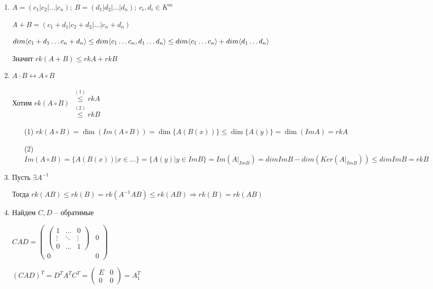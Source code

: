 \documentclass[12pt]{article}
\begin{document}
\begin{enumerate}
    \item $A = (c_1 | c_2 | \ldots | c_n);\ B = (d_1 | d_2 | \ldots | d_n);\ c_i, d_i \in K^m$
    
    $A + B = (c_1 + d_1 | c_2 + d_2 | \ldots | c_n + d_n)$

    $dim\langle c_1 + d_1 \ldots c_n + d_n \rangle \leq dim\langle c_1 \ldots c_n, d_1 \ldots d_n \rangle \leq dim\langle c_1 \ldots c_n \rangle + dim\langle d_1 \ldots d_n \rangle$

    Значит $rk(A + B) \leq rkA + rkB$

    \item $A \cdot B \leftrightarrow A \circ B$
    
    Хотим $rk(A \circ B) \begin{gathered}
        \stackrel{(1)}{\leq} rkA \\
        \stackrel{(2)}{\leq} rkB
    \end{gathered}$

    \begin{itemize}
        \item[(1)] $rk(A \circ B) = \dim(Im(A \circ B)) = \dim\{A(B(x))\} \leq \dim\{A(y)\} = \dim(ImA) = rkA$
        \item[(2)] $Im(A \circ B) = \{A(B(x)) | x \in \ldots \} = \{ A(y) | y \in ImB \} = Im(A|_{ImB}) = dimImB - dim(Ker(A|_{ImB})) \leq dimImB = rkB$
    \end{itemize}

    \item Пусть $\exists A^{-1}$
    
    Тогда $rk(AB) \leq rk(B) = rk(A^{-1}AB) \leq rk(AB) \Rightarrow rk(B) = rk(AB)$

    \item Найдем $C, D$ -- обратимые
    
    $CAD = \begin{pmatrix}
        \begin{pmatrix}
            1 & \ldots & 0 \\
            \vdots & \ddots & \vdots \\
            0 & \ldots & 1
        \end{pmatrix} & 0 \\
        0 & 0
    \end{pmatrix}$

    $(CAD)^T = D^TA^TC^T = \begin{pmatrix}
        E & 0 \\
        0 & 0
    \end{pmatrix} = A_1^T$


\end{enumerate}
\end{document}

